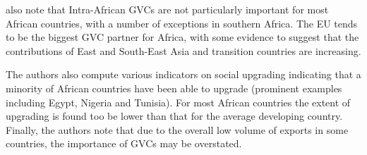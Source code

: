 \documentclass[a4paper]{article}
\begin{document}
\citet{foster2015global} also note that Intra-African GVCs are not particularly important for most African countries, with a number of exceptions in southern Africa. The EU tends to be the biggest GVC partner for Africa, with some evidence to suggest that the contributions of East and South-East Asia and transition countries are increasing. \newline



The authors also compute various indicators on social upgrading indicating that a minority of African countries have been able to upgrade (prominent examples including Egypt, Nigeria and Tunisia). For most African countries the extent of upgrading is found too be lower than that for the average developing country. %
Finally, the authors note that due to the overall low volume of exports in some countries, the importance  of GVCs may be overstated. \newline



\end{document}
